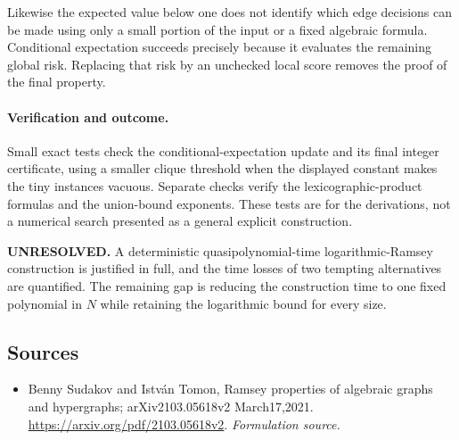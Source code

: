 \documentclass[11pt]{article}
\begin{document}
Likewise the expected value below one does not identify which edge decisions can be made using only a small portion of the input or a fixed algebraic formula. Conditional expectation succeeds precisely because it evaluates the remaining global risk. Replacing that risk by an unchecked local score removes the proof of the final property.

\paragraph{Verification and outcome.}
Small exact tests check the conditional-expectation update and its final integer certificate, using a smaller clique threshold when the displayed constant makes the tiny instances vacuous. Separate checks verify the lexicographic-product formulas and the union-bound exponents. These tests are for the derivations, not a numerical search presented as a general explicit construction.

\textbf{UNRESOLVED.} A deterministic quasipolynomial-time logarithmic-Ramsey construction is justified in full, and the time losses of two tempting alternatives are quantified. The remaining gap is reducing the construction time to one fixed polynomial in $N$ while retaining the logarithmic bound for every size.

\subsection{Sources}
\begin{itemize}
\item[S1]Benny Sudakov and István Tomon, Ramsey properties of algebraic graphs and hypergraphs; arXiv2103.05618v2 March17,2021.
\url{https://arxiv.org/pdf/2103.05618v2}.
\textit{Formulation source.}
\end{itemize}
\end{document}
